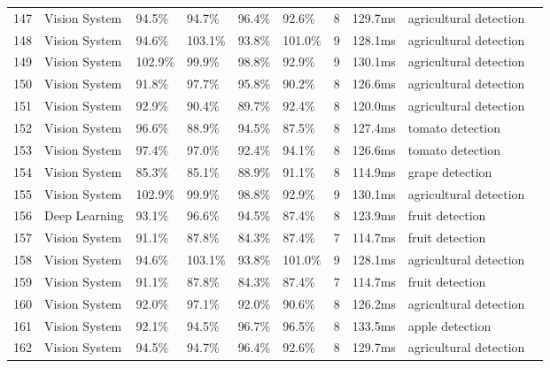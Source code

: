 \begin{table*}[htbp]
\begin{tabular}{p{}p{}p{}p{}p{}p{}p{}p{}p{}p{}}
 147 & Vision System & 94.5\% & 94.7\% & 96.4\% & 92.6\% & 8 & 129.7ms & agricultural detection & \cite{ampatzidis2017ipathology} \\
 148 & Vision System & 94.6\% & 103.1\% & 93.8\% & 101.0\% & 9 & 128.1ms & agricultural detection & \cite{birrell2020field} \\
 149 & Vision System & 102.9\% & 99.9\% & 98.8\% & 92.9\% & 9 & 130.1ms & agricultural detection & \cite{hariharanautobot} \\
 150 & Vision System & 91.8\% & 97.7\% & 95.8\% & 90.2\% & 8 & 126.6ms & agricultural detection & \cite{samtani2019status} \\
 151 & Vision System & 92.9\% & 90.4\% & 89.7\% & 92.4\% & 8 & 120.0ms & agricultural detection & \cite{barth2016design} \\
 152 & Vision System & 96.6\% & 88.9\% & 94.5\% & 87.5\% & 8 & 127.4ms & tomato detection & \cite{lili2017development} \\
 153 & Vision System & 97.4\% & 97.0\% & 92.4\% & 94.1\% & 8 & 126.6ms & tomato detection & \cite{ling2019dual} \\
 154 & Vision System & 85.3\% & 85.1\% & 88.9\% & 91.1\% & 8 & 114.9ms & grape detection & \cite{luo2016robust} \\
 155 & Vision System & 102.9\% & 99.9\% & 98.8\% & 92.9\% & 9 & 130.1ms & agricultural detection & \cite{lin2021collision} \\
 156 & Deep Learning & 93.1\% & 96.6\% & 94.5\% & 87.4\% & 8 & 123.9ms & fruit detection & \cite{onishi2019automated} \\
 157 & Vision System & 91.1\% & 87.8\% & 84.3\% & 87.4\% & 7 & 114.7ms & fruit detection & \cite{font2014proposal} \\
 158 & Vision System & 94.6\% & 103.1\% & 93.8\% & 101.0\% & 9 & 128.1ms & agricultural detection & \cite{sepulveda2020robotic} \\
 159 & Vision System & 91.1\% & 87.8\% & 84.3\% & 87.4\% & 7 & 114.7ms & fruit detection & \cite{qiang2014identification} \\
 160 & Vision System & 92.0\% & 97.1\% & 92.0\% & 90.6\% & 8 & 126.2ms & agricultural detection & \cite{de2018development} \\
 161 & Vision System & 92.1\% & 94.5\% & 96.7\% & 96.5\% & 8 & 133.5ms & apple detection & \cite{li2016characterizing} \\
 162 & Vision System & 94.5\% & 94.7\% & 96.4\% & 92.6\% & 8 & 129.7ms & agricultural detection & \cite{kusumam20173d} \\

\end{tabular}
\end{table*}
